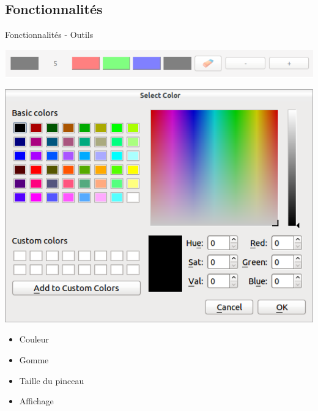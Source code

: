 \documentclass{beamer}
\begin{document}
		\subsection{Fonctionnalités}
		\begin{frame}{Fonctionnalités - Outils}
			\begin{center}\includegraphics[scale=0.45]{toolbar.png}\end{center}
			\begin{center}\includegraphics[scale=0.2]{colorpicker.png}\end{center}
			\begin{itemize}
				\item Couleur
				\item Gomme
				\item Taille du pinceau
				\item Affichage
			\end{itemize}
		\end{frame}
\end{document}
